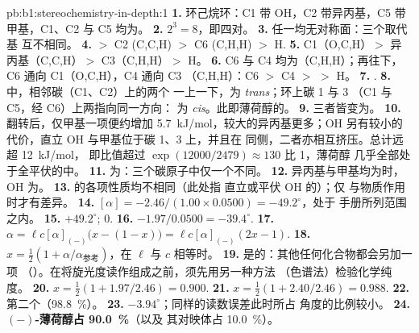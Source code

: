 \begin{solution}{pb:b1:stereochemistry-in-depth:1}
\textbf{1.} 环己烷环：C1 带 OH，C2 带异丙基，C5 带
甲基，C1、C2 与 C5 均为。
\textbf{2.} $2^3 = 8$，即四对。
\textbf{3.} 任一均无对称面：三个取代基
互不相同。
\textbf{4.}  $>$ C2 (C,C,H) $>$ C6 (C,H,H) $>$ H.
\textbf{5.} C1（O,C,H）$>$ 异丙基（C,C,H）$>$ C3（C,H,H）$>$ H。
\textbf{6.} C6 与 C4 均为（C,H,H）；再往下，C6 通向 C1（O,C,H），C4 通向 C3
（C,H,H）：C6 $>$ C4 $>$  $>$ H。
\textbf{7.} .
\textbf{8.} 中，相邻碳（C1、C2）上的两个
一上一下，为 \textit{trans}；环上碳 1 与 3
（C1 与 C5，经 C6）上两指向同一方向：
为 \textit{cis}。此即薄荷醇的。
\textbf{9.} 三者皆变为。
\textbf{10.} 翻转后，仅甲基一项便约增加
\qty{5.7}{kJ/mol}，较大的异丙基更多；OH 另有较小的
代价，直立 OH 与甲基位于碳 1、3 上，并且在
同侧，二者亦相互挤压。总计远超 \qty{12}{kJ/mol}，
即比值超过 $\exp(12000/2479) \approx 130$ 比 1，薄荷醇
几乎全部处于全平伏的中。
\textbf{11.} 为：三个碳原子中仅一个不同。
\textbf{12.} 异丙基与甲基均为时，OH 为。
\textbf{13.} 的各项性质均不相同（此处指
直立或平伏 OH 的）；仅
与物质作用时才有差异。
\textbf{14.} $[\alpha] = -2.46/(1.00 \times 0.0500) = -49.2^\circ$，处于
手册所列范围之内。
\textbf{15.} $+49.2^\circ$; $0$.
\textbf{16.} $-1.97/0.0500 = -39.4^\circ$.
\textbf{17.} $\alpha = \ell c[\alpha]_{(-)}\bigl(x - (1 - x)\bigr) =
\ell c[\alpha]_{(-)}(2x - 1)$.
\textbf{18.} $x = \frac12(1 + \alpha/\alpha_{\text{参考}})$，在 $\ell$ 与 $c$ 相等时。
\textbf{19.} 是的：其他任何化合物都会另加一项
（）。在将旋光度读作组成之前，须先用另一种方法
（色谱法）检验化学纯度。
\textbf{20.} $x = \frac12(1 + 1.97/2.46) = 0.900$.
\textbf{21.} $x = \frac12(1 + 2.40/2.46) = 0.988$.
\textbf{22.} 第二个（\qty{98.8}{\percent}）。
\textbf{23.} $-3.94^\circ$；同样的读数误差此时所占
角度的比例较小。
\textbf{24.} \textbf{$(-)$-薄荷醇占 \qty{90.0}{\percent}}（以及
其对映体占 \qty{10.0}{\percent}）。
\end{solution}
